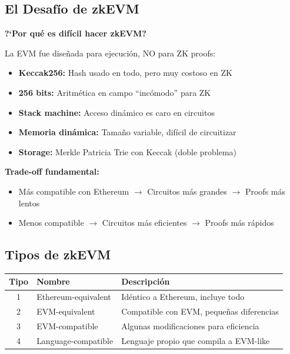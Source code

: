 \documentclass[11pt,a4paper,twoside]{book}
\begin{document}
\subsection{El Desaf\'io de zkEVM}

\begin{intuicion}
\textbf{?`Por qu\'e es dif\'icil hacer zkEVM?}

La EVM fue dise\~nada para ejecuci\'on, NO para ZK proofs:
\begin{itemize}
    \item \textbf{Keccak256:} Hash usado en todo, pero muy costoso en ZK
    \item \textbf{256 bits:} Aritm\'etica en campo ``inc\'omodo'' para ZK
    \item \textbf{Stack machine:} Acceso din\'amico es caro en circuitos
    \item \textbf{Memoria din\'amica:} Tama\~no variable, dif\'icil de circuitizar
    \item \textbf{Storage:} Merkle Patricia Trie con Keccak (doble problema)
\end{itemize}

\textbf{Trade-off fundamental:}
\begin{itemize}
    \item M\'as compatible con Ethereum $\to$ Circuitos m\'as grandes $\to$ Proofs m\'as lentos
    \item Menos compatible $\to$ Circuitos m\'as eficientes $\to$ Proofs m\'as r\'apidos
\end{itemize}
\end{intuicion}

\subsection{Tipos de zkEVM}

\begin{center}
\begin{tabular}{clp{6cm}}
\toprule
\textbf{Tipo} & \textbf{Nombre} & \textbf{Descripci\'on} \\
\midrule
1 & Ethereum-equivalent & Id\'entico a Ethereum, incluye todo \\
2 & EVM-equivalent & Compatible con EVM, peque\~nas diferencias \\
3 & EVM-compatible & Algunas modificaciones para eficiencia \\
4 & Language-compatible & Lenguaje propio que compila a EVM-like \\
\bottomrule
\end{tabular}
\end{center}
\end{document}
